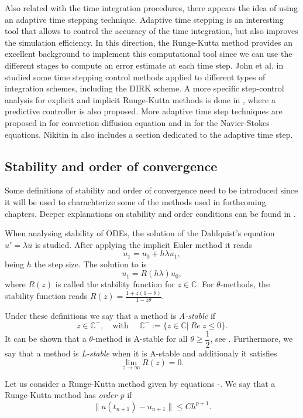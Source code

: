 Also related with the time integration procedures, there appears the idea of using an adaptive time stepping technique. Adaptive time stepping is an interesting tool that allows to control the accuracy of the time integration, but also improves the simulation efficiency. In this direction, the Runge-Kutta method provides an excellent background to implement this computational tool since we can use the different stages to compute an error estimate at each time step. John et al. in \cite{john_adaptive_2010} studied some time stepping control methods applied to different types of integration schemes, including the DIRK scheme. A more specific step-control analysis for explicit and implicit Runge-Kutta methods is done in \cite{hairer_solving_1993}, where a predictive controller is also proposed. More adaptive time step techniques are proposed in \cite{gresho_adaptive_2008} for convection-diffusion equation and in \cite{kay_adaptive_2010} for the Navier-Stokes equations. Nikitin in \cite{nikitin_third-order-accurate_2006} also includes a section dedicated to the adaptive time step.


\subsection{Stability and order of convergence}
Some definitions of stability and order of convergence need to be introduced since it will be used to charachterize some of the methods used in forthcoming chapters. Deeper explanations on stability and order conditions can be found in \cite{hairer_solving_2008,hairer_solving_1993}.

When analysing stability of ODEs, the solution of the Dahlquist's equation $ u'=\lambda u $ is studied. After applying the implicit Euler method it reads
\begin{equation}
\label{eq-C2_Dahlquist}
u_1=u_0+h\lambda u_1,
\end{equation}
being $ h $ the step size. The solution to  is
\begin{equation}
\label{eq-C2_Dahlquist_sol}
u_1=R(h\lambda)u_0,
\end{equation}
where $ R(z) $ is called the stability function for $ z\in\mathbb{C} $. For $ \theta $-methods, the stability function reads $ R(z)=\frac{1+z(1-\theta)}{1-z\theta} $.

Under these definitions we say that a method is \textit{A-stable} if 
\begin{equation}
\label{eq-C2_A_stable}
z\in\mathbb{C}^-,\quad\mbox{with $\quad\mathbb{C^-}:=\{z\in\mathbb{C}|\ Re\ z\le0\} $}.
\end{equation}
It can be shown that a $ \theta $-method is A-stable for all $ \theta\ge\dfrac{1}{2} $, see \cite{lambert_numerical_1991}. Furthermore, we say that a method is \textit{L-stable} when it is A-stable and additionaly it satisfies
\begin{equation}
\label{eq-C2_L_stable}
\lim_{z\rightarrow\infty}R(z)=0.
\end{equation}

Let us consider a Runge-Kutta method given by equations -. We say that a Runge-Kutta method has \textit{order p} if 
\begin{equation}
\label{eq-C2_time_RK_order}
\|u(t_{n+1})-u_{n+1}\|\le Ch^{p+1}.
\end{equation}